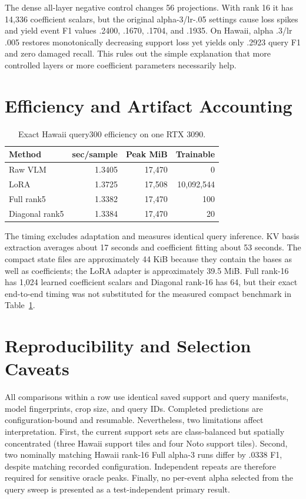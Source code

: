 \documentclass[conference]{IEEEtran}
\begin{document}
The dense all-layer negative control changes 56 projections. With rank 16 it
has 14,336 coefficient scalars, but the original alpha-3/lr-.05 settings cause
loss spikes and yield event F1 values .2400, .1670, .1704, and .1935. On Hawaii,
alpha .3/lr .005 restores monotonically decreasing support loss yet yields only
.2923 query F1 and zero damaged recall. This rules out the simple explanation
that more controlled layers or more coefficient parameters necessarily help.

\section{Efficiency and Artifact Accounting}
\begin{table}[t]
\centering\small
\caption{Exact Hawaii query300 efficiency on one RTX 3090.}
\label{tab:efficiency}
\begin{tabular}{lrrr}
\toprule
Method & sec/sample & Peak MiB & Trainable\\
\midrule
Raw VLM & 1.3405 & 17,470 & 0\\
LoRA & 1.3725 & 17,508 & 10,092,544\\
Full rank5 & 1.3382 & 17,470 & 100\\
Diagonal rank5 & 1.3384 & 17,470 & 20\\
\bottomrule
\end{tabular}
\end{table}

The timing excludes adaptation and measures identical query inference. KV basis
extraction averages about 17 seconds and coefficient fitting about 53 seconds.
The compact state files are approximately 44 KiB because they contain the
bases as well as coefficients; the LoRA adapter is approximately 39.5 MiB. Full
rank-16 has 1,024 learned coefficient scalars and Diagonal rank-16 has 64, but
their exact end-to-end timing was not substituted for the measured compact
benchmark in Table~\ref{tab:efficiency}.

\section{Reproducibility and Selection Caveats}
All comparisons within a row use identical saved support and query manifests,
model fingerprints, crop size, and query IDs. Completed predictions are
configuration-bound and resumable. Nevertheless, two limitations affect
interpretation. First, the current support sets are class-balanced but spatially
concentrated (three Hawaii support tiles and four Noto support tiles). Second,
two nominally matching Hawaii rank-16 Full alpha-3 runs differ by .0338 F1,
despite matching recorded configuration. Independent repeats are therefore
required for sensitive oracle peaks. Finally, no per-event alpha selected from
the query sweep is presented as a test-independent primary result.



\end{document}
